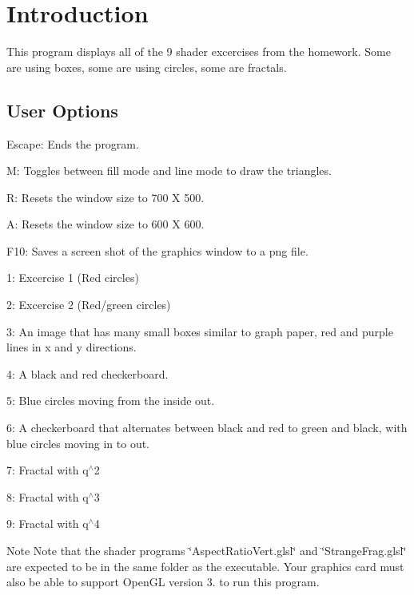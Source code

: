 \hypertarget{index_intro}{}\section{Introduction}\label{index_intro}
This program displays all of the 9 shader excercises from the homework. Some are using boxes, some are using circles, some are fractals.\hypertarget{index_options}{}\subsection{User Options}\label{index_options}

\begin{DoxyItemize}
\item Escape\+: Ends the program.
\item M\+: Toggles between fill mode and line mode to draw the triangles.
\item R\+: Resets the window size to 700 X 500.
\item A\+: Resets the window size to 600 X 600.
\item F10\+: Saves a screen shot of the graphics window to a png file.
\item 1\+: Excercise 1 (Red circles)
\item 2\+: Excercise 2 (Red/green circles)
\item 3\+: An image that has many small boxes similar to graph paper, red and purple lines in x and y directions.
\item 4\+: A black and red checkerboard.
\item 5\+: Blue circles moving from the inside out.
\item 6\+: A checkerboard that alternates between black and red to green and black, with blue circles moving in to out.
\item 7\+: Fractal with q$^\wedge$2
\item 8\+: Fractal with q$^\wedge$3
\item 9\+: Fractal with q$^\wedge$4
\end{DoxyItemize}

\begin{DoxyNote}{Note}
Note that the shader programs \char`\"{}\+Aspect\+Ratio\+Vert.\+glsl\char`\"{} and \char`\"{}\+Strange\+Frag.\+glsl\char`\"{} are expected to be in the same folder as the executable. Your graphics card must also be able to support Open\+GL version 3. to run this program.
\end{DoxyNote}


